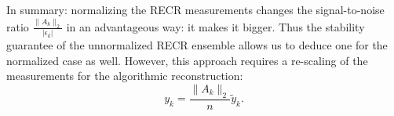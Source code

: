 In summary: normalizing the RECR measurements changes the signal-to-noise ratio $\frac{ \|  A_k \|_2}{| \epsilon_k|}$ in an advantageous way: it makes it bigger. Thus the stability guarantee of the unnormalized RECR ensemble allows us to deduce one for the normalized case as well. However, this approach requires a re-scaling of the measurements for the algorithmic reconstruction:
\[
  y_k = \frac{ \|  A_k \|_2}{n} \tilde{y}_k.
\]


